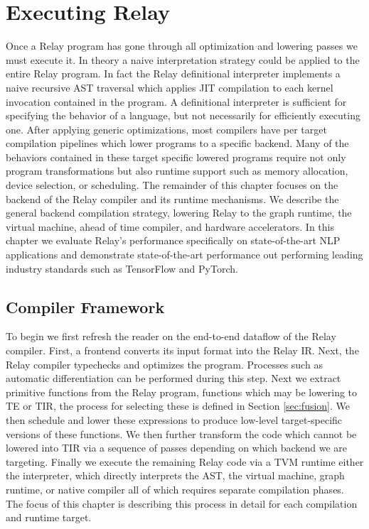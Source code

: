\chapter{Executing Relay}
\label{ch:execute}

Once a Relay program has gone through all optimization
  and lowering passes we must execute it.
In theory a naive interpretation strategy could be applied
    to the entire Relay program.
In fact the Relay definitional interpreter
  implements a naive recursive AST traversal
  which applies JIT compilation to each kernel invocation
  contained in the program.
A definitional interpreter is sufficient
  for specifying the behavior of a language,
  but not necessarily for efficiently executing one.
After applying generic optimizations,
  most compilers have per target compilation
  pipelines which lower programs to a specific
  backend.
Many of the behaviors contained in these target
  specific lowered programs require not only
  program transformations but also runtime
  support such as memory allocation,
  device selection, or scheduling.
The remainder of this chapter focuses on the backend
  of the Relay compiler and its runtime mechanisms.
We describe the general backend compilation strategy,
  lowering Relay to the graph runtime, the virtual machine,
  ahead of time compiler, and hardware accelerators.
In this chapter we evaluate Relay's performance specifically
  on state-of-the-art NLP applications and demonstrate
  state-of-the-art performance out performing leading industry standards
  such as TensorFlow and PyTorch.

\section{Compiler Framework}

To begin we first refresh the reader on the end-to-end
  dataflow of the Relay compiler.
First, a frontend converts its input format into the Relay IR.
Next, the Relay compiler typechecks and optimizes the program.
Processes such as automatic differentiation can be performed
  during this step.
Next we extract primitive functions
  from the Relay program, functions which may be lowering to TE or TIR,
  the process for selecting these
  is defined in Section \ref{sec:fusion}.
We then schedule and lower these
  expressions to produce low-level target-specific versions
  of these functions.
We then further transform the code which cannot be lowered
  into TIR via a sequence of passes depending on which backend
  we are targeting.
Finally we execute the remaining Relay code via a TVM runtime
  either the interpreter, which directly interprets the AST,
  the virtual machine, graph runtime, or native compiler all
  of which requires separate compilation phases.
The focus of this chapter is describing this process in
  detail for each compilation and runtime target.

